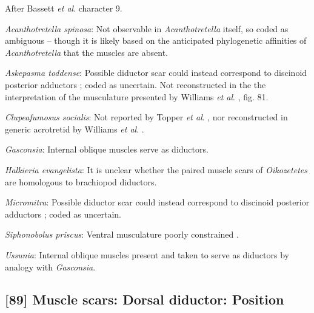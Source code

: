 \documentclass[openany]{book}
\begin{document}
After Bassett \emph{et al}.
\citeyearpar{Bassett2001Functionalmorphology} character 9.

\hypertarget{Acanthotretella_spinosa-coding-88}{}
\emph{Acanthotretella spinosa}: Not observable in \emph{Acanthotretella}
itself, so coded as ambiguous -- though it is likely based on the
anticipated phylogenetic affinities of \emph{Acanthotretella} that the
muscles are absent.

\hypertarget{Askepasma_toddense-coding-88}{}
\emph{Askepasma toddense}: Possible diductor scar could instead
correspond to discinoid posterior adductors
\citep{Williams1998Thediversity}; coded as uncertain. Not reconstructed
in the the interpretation of the musculature presented by Williams
\emph{et al}. \citeyearpar{Williams2000LinguliformeaCraniiformea}, fig.
81.

\hypertarget{Clupeafumosus_socialis-coding-88}{}
\emph{Clupeafumosus socialis}: Not reported by Topper \emph{et al}.
\citeyearpar{Topper2013Reappraisalof}, nor reconstructed in generic
acrotretid by Williams \emph{et al}.
\citeyearpar{Williams2000LinguliformeaCraniiformea}.

\hypertarget{Gasconsia-coding-88}{}
\emph{Gasconsia}: Internal oblique muscles serve as diductors.

\hypertarget{Halkieria_evangelista-coding-88}{}
\emph{Halkieria evangelista}: It is unclear whether the paired muscle
scars of \emph{Oikozetetes} are homologous to brachiopod diductors.

\hypertarget{Micromitra-coding-88}{}
\emph{Micromitra}: Possible diductor scar could instead correspond to
discinoid posterior adductors \citep{Williams1998Thediversity}; coded as
uncertain.

\hypertarget{Siphonobolus_priscus-coding-88}{}
\emph{Siphonobolus priscus}: Ventral musculature poorly constrained
\citep{Williams2000LinguliformeaCraniiformea, Popov2009Earlyontogeny}.

\hypertarget{Ussunia-coding-88}{}
\emph{Ussunia}: Internal oblique muscles present \citep{Nikitin1984} and
taken to serve as diductors by analogy with \emph{Gasconsia}.

\subsection*{{[}89{]} Muscle scars: Dorsal diductor:
Position}\label{muscle-scars-dorsal-diductor-position}
\end{document}
